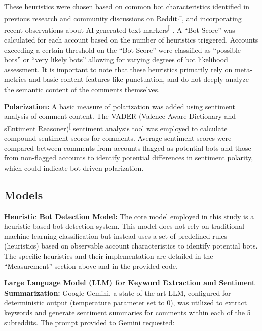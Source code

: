 \documentclass[
  12pt,
  letterpaper,
  DIV=11,
  numbers=noendperiod]{scrartcl}
\begin{document}
These heuristics were chosen based on common bot characteristics
identified in previous research and community discussions on
Reddit\textsuperscript{{[}--\citeproc{ref-botproblem7daystodie}{25}{]}},
and incorporating recent observations about AI-generated text
markers\textsuperscript{{[}--\citeproc{ref-nightwateremdash}{22}{]}}.
A ``Bot Score'' was calculated for each account based on the number of
heuristics triggered. Accounts exceeding a certain threshold on the
``Bot Score'' were classified as ``possible bots'' or ``very likely
bots'' allowing for varying degrees of bot likelihood assessment. It is
important to note that these heuristics primarily rely on meta-metrics
and basic content features like punctuation, and do not deeply analyze
the semantic content of the comments themselves.

\textbf{Polarization:} A basic measure of polarization was added using
sentiment analysis of comment content. The VADER (Valence Aware
Dictionary and sEntiment
Reasoner)\textsuperscript{{[}\citeproc{ref-hutto2014vader}{26}{]}}
sentiment analysis tool was employed to calculate compound sentiment
scores for comments. Average sentiment scores were compared between
comments from accounts flagged as potential bots and those from
non-flagged accounts to identify potential differences in sentiment
polarity, which could indicate bot-driven polarization.

\subsection{Models}\label{models}

\textbf{Heuristic Bot Detection Model:} The core model employed in this
study is a heuristic-based bot detection system. This model does not
rely on traditional machine learning classification but instead uses a
set of predefined rules (heuristics) based on observable account
characteristics to identify potential bots. The specific heuristics and
their implementation are detailed in the ``Measurement'' section above
and in the provided code.

\textbf{Large Language Model (LLM) for Keyword Extraction and Sentiment
Summarization:} Google Gemini, a state-of-the-art LLM, configured for
deterministic output (temperature parameter set to 0), was utilized to
extract keywords and generate sentiment summaries for comments within
each of the 5 subreddits. The prompt provided to Gemini requested:
\end{document}
